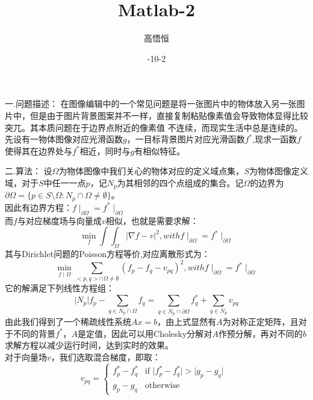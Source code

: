 \documentclass[a4paper]{ltxdoc}
\begin{document}
\title{Matlab-2}
\author{高悟恒 }
\date{-10-2}
\maketitle



一.问题描述：
在图像编辑中的一个常见问题是将一张图片中的物体放入另一张图片中，但是由于图片背景图案并不一样，直接复制粘贴像素值会导致物体显得比较突兀。其本质问题在于边界点附近的像素值
不连续，而现实生活中总是连续的。先设有一物体图像对应光滑函数$g$，一目标背景图片对应光滑函数$f^*$,现求一函数$f$使得其在边界处与$f^*$相近，同时与$g$有相似特征。




二.算法：
设$\Omega$为物体图像中我们关心的物体对应的定义域点集，$S$为物体图像定义域，对于$S$中任一一点$p$，记$N_p$为其相邻的四个点组成的集合。记$\Omega$的边界为$\partial \Omega=\{p\in S\setminus \Omega:N_p\cap \Omega \neq \emptyset \}$。\\
因此有边界方程：$f\mid_{\partial \Omega}=f^*\mid_{\partial \Omega}$\\
而$f$与对应梯度场与向量成$v$相似，也就是需要求解：
\begin{equation}
\min\limits_f\int\int_{\Omega}\vert\nabla f-v\vert^2,with f\mid_{\partial \Omega}=f^*\mid_{\partial \Omega}
\end{equation}
其与Dirichlet问题的Poisson方程等价,对应离散形式为：
\begin{equation}
\min\limits_{f\mid \Omega}\sum_{<p,q>\cap \Omega\neq \emptyset }(f_p-f_q-v_{pq})^2,with f\mid_{\partial \Omega}=f^*\mid_{\partial \Omega}
\end{equation}
它的解满足下列线性方程组：
\begin{equation}
\vert N_p\vert f_p-\sum_{q\in N_p\cap \Omega}f_q=\sum_{q\in N_p\cap \partial\Omega}f^*_q+\sum_{q\in N_p}v_{pq}
\end{equation}
由此我们得到了一个稀疏线性系统$Ax=b$，由上式显然有$A$为对称正定矩阵，且对于不同的背景$f^*$，$A$是定值，因此可以用Cholesky分解对$A$作预分解，再对不同的$b$求解方程以减少运行时间，达到实时的效果。\\
对于向量场$v$，我们选取混合梯度，即取：
\begin{equation}
v_{pq}=
\begin{cases}
f^*_p-f^*_q&\mbox{if $\vert f^*_p-f^*_q\vert > \vert g_p-g_q\vert$ }\\
g_p-g_q&\mbox{otherwise}
\end{cases}
\end{equation}
\end{document}
